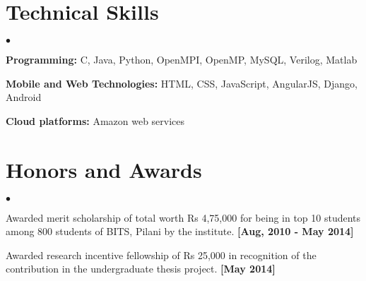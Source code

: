 \documentclass[margin,line]{res}
\newenvironment{list2}{
  \begin{list}{$\bullet$}{%
      \setlength{\itemsep}{0in}
      \setlength{\parsep}{0in} \setlength{\parskip}{0in}
      \setlength{\topsep}{0in} \setlength{\partopsep}{0in} 
      \setlength{\leftmargin}{0.2in}}}{\end{list}}
\begin{document}
\begin{resume}
\section{\sc Technical Skills} 
\begin{list2}

\item {\bf Programming:} C, Java, Python, OpenMPI, OpenMP, MySQL, Verilog, Matlab
\item {\bf Mobile and Web Technologies:} HTML, CSS, JavaScript, AngularJS, Django, Android
\item {\bf Cloud platforms:} Amazon web services
\end{list2}
 

\section{\sc Honors and Awards}
\begin{list2}
\item Awarded merit scholarship of total worth Rs 4,75,000 for being in top 10 students among 800 students of BITS, Pilani by the institute. {\bf [Aug, 2010 - May 2014]}

\item Awarded research incentive fellowship of Rs 25,000 in recognition of the contribution in the
undergraduate thesis project. {\bf [May 2014]}
\end{list2}

\end{resume}
\end{document}
